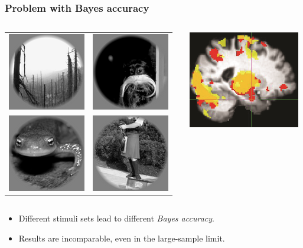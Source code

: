 \documentclass{beamer}
\begin{document}
\begin{frame}
\frametitle{Problem with Bayes accuracy}
\begin{columns}
\begin{column}{0.6\textwidth}
\begin{tabular}{cc}
\includegraphics[scale = 0.5]{img5.png} &
\includegraphics[scale = 0.5]{img6.png} \\
\includegraphics[scale = 0.5]{img7.png} &
\includegraphics[scale = 0.5]{img8.png}
\end{tabular}
\end{column}
\begin{column}{0.4\textwidth}
\includegraphics[scale = 0.5]{smbrain2.png}
\end{column}
\end{columns}
\begin{itemize}
\item Different stimuli sets lead to different \emph{Bayes accuracy}. \pause
\item Results are incomparable, even in the large-sample limit.
\end{itemize}
\end{frame}
\end{document}
